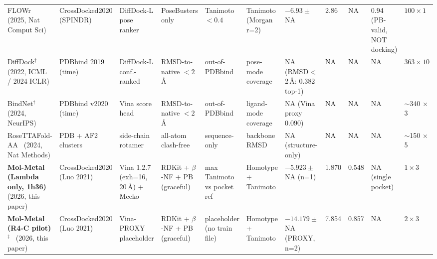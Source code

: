 \begin{table}[t]
\begin{tabular}{p{2.0cm}p{1.7cm}p{1.7cm}p{1.2cm}p{1.2cm}p{1.2cm}p{1.6cm}p{0.8cm}p{0.8cm}p{0.9cm}p{1.6cm}}
FLOWr~\cite{footnote:flowr} (2025, Nat Comput Sci)     & CrossDocked2020 (SPINDR)    & DiffDock-L pose ranker   & PoseBusters only      & Tanimoto $<0.4$ & Tanimoto (Morgan r=2) & $-6.93 \pm$ NA             & 2.86 & NA   & 0.94 (PB-valid, NOT docking) & $100 \times 1$ \\
DiffDock$^\dagger$~\cite{footnote:diffdock} (2022, ICML / 2024 ICLR) & PDBbind 2019 (time) & DiffDock-L conf.-ranked & RMSD-to-native $<2$\,\AA{} & out-of-PDBbind & pose-mode coverage & NA (RMSD$<$2\,\AA{}: 0.382 top-1) & NA & NA & NA & $363 \times 10$ \\
BindNet$^\dagger$~\cite{footnote:bindnet} (2024, NeurIPS) & PDBbind v2020 (time)     & Vina score head          & RMSD-to-native $<2$\,\AA{} & out-of-PDBbind & ligand-mode coverage & NA (Vina proxy 0.090) & NA & NA & NA & $\sim$340 $\times$ 3 \\
RoseTTAFold-AA~\cite{footnote:rosettafoldaa} (2024, Nat Methods) & PDB + AF2 clusters  & side-chain rotamer       & all-atom clash-free   & sequence-only    & backbone RMSD        & NA (structure-only)        & NA   & NA   & NA             & $\sim$150 $\times$ 5 \\
\hline
\textbf{Mol-Metal (Lambda only, 1h36)}~\cite{footnote:wf3_citeonly_sota} (2026, this paper)         & CrossDocked2020 (Luo 2021)  & Vina 1.2.7 (exh=16, 20\,\AA{}) + Meeko & RDKit + $\beta$-NF + PB (graceful) & max Tanimoto vs pocket ref & Homotype + Tanimoto & $-5.923 \pm$ NA (n=1)       & 1.870 & 0.548 & NA (single pocket) & $1 \times 3$ \\
\textbf{Mol-Metal (R4-C pilot)$^\ddagger$}~\cite{footnote:wf3_citeonly_sota} (2026, this paper)   & CrossDocked2020 (Luo 2021)  & Vina-PROXY placeholder   & RDKit + $\beta$-NF + PB (graceful) & placeholder (no train file) & Homotype + Tanimoto & $-14.179 \pm$ NA (PROXY, n=2) & 7.854 & 0.857 & NA & $2 \times 3$ \\
\hline
\end{tabular}


\end{table}
